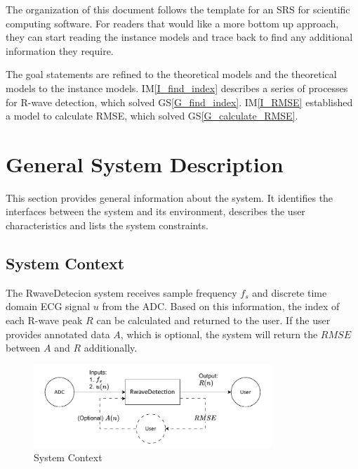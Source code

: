 \documentclass[12pt]{article}
\newcommand{\gsref}[1]{GS\ref{#1}} \newcounter{instnum} %
\newcommand{\iref}[1]{IM\ref{#1}} \newcounter{reqnum} %
\begin{document}
The organization of this document follows the template for an SRS for scientific
computing software. For readers that would like a more bottom up approach, they
can start reading the instance models and trace back to find any additional
information they require.

The goal statements are refined to the theoretical models and the theoretical
models to the instance models.  \iref{I_find_index} describes a series of
processes for R-wave detection, which solved \gsref{G_find_index}.
\iref{I_RMSE} established a model to calculate RMSE, which solved
\gsref{G_calculate_RMSE}.

\section{General System Description}

This section provides general information about the system.  It identifies the
interfaces between the system and its environment, describes the user
characteristics and lists the system constraints.

\subsection{System Context}

The RwaveDetecion system receives sample frequency $f_s$ and discrete time
domain ECG signal $u$ from the ADC.  Based on this information, the index of
each R-wave peak $R$ can be calculated and returned to the user.  If the user
provides annotated data $A$, which is optional, the system will return the
$RMSE$ between $A$ and $R$ additionally.

\begin{figure}[h!]
\begin{center}
 \includegraphics[width=0.8\textwidth]{SystemContextFigure}
\caption{System Context}
\label{Fig_SystemContext} 
\end{center}
\end{figure}
\end{document}
